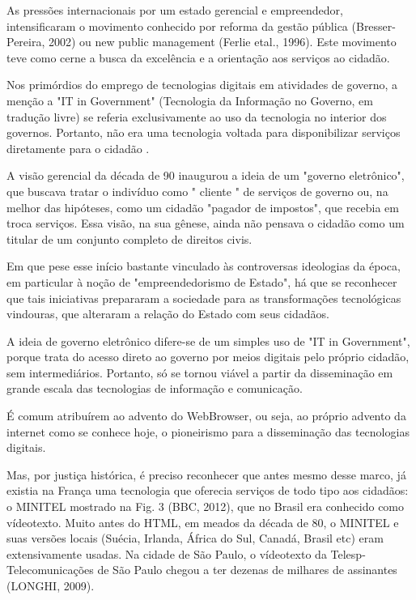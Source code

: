 As pressões internacionais por um estado gerencial e empreendedor, intensificaram o movimento conhecido por reforma da gestão pública (Bresser-Pereira, 2002) ou new public management (Ferlie etal., 1996). Este movimento teve como cerne a busca da excelência e a orientação aos serviços ao cidadão.

Nos primórdios do emprego de tecnologias digitais em atividades de governo, a menção a "IT in Government" (Tecnologia da Informação no Governo, em tradução livre) se referia exclusivamente ao uso da tecnologia no interior dos governos. Portanto, não era uma tecnologia voltada para disponibilizar serviços diretamente para o cidadão .

A visão gerencial da década de 90 inaugurou a ideia de um "governo eletrônico", que buscava tratar o indivíduo como " cliente " de serviços de governo ou, na melhor das hipóteses, como um cidadão "pagador de impostos", que recebia em troca serviços. Essa visão, na sua gênese, ainda não pensava o cidadão como um titular de um conjunto completo de direitos civis.

Em que pese esse início bastante vinculado às controversas ideologias da época, em particular à noção de "empreendedorismo de Estado", há que se reconhecer que tais iniciativas prepararam a sociedade para as transformações tecnológicas vindouras, que alteraram a relação do Estado com seus cidadãos.

A ideia de governo eletrônico difere-se de um simples uso de "IT in Government", porque trata do acesso direto ao governo por meios digitais pelo próprio cidadão, sem intermediários. Portanto, só se tornou viável a partir da disseminação em grande escala das tecnologias de informação e comunicação.

É comum atribuírem ao advento do WebBrowser, ou seja, ao próprio advento da internet como se conhece hoje, o pioneirismo para a disseminação das tecnologias digitais.

Mas, por justiça histórica, é preciso reconhecer que antes mesmo desse marco, já existia na França uma tecnologia que oferecia serviços de todo tipo aos cidadãos: o MINITEL mostrado na Fig. 3 (BBC, 2012), que no Brasil era conhecido como vídeotexto. Muito antes do HTML, em meados da década de 80, o MINITEL e suas versões locais (Suécia, Irlanda, África do Sul, Canadá, Brasil etc) eram extensivamente usadas. Na cidade de São Paulo, o vídeotexto da Telesp- Telecomunicações de São Paulo chegou a ter dezenas de milhares de assinantes (LONGHI, 2009).



